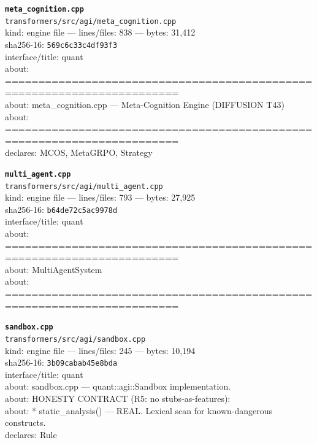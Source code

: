 \noindent\textbf{\texttt{meta\_cognition.cpp}}\\
\texttt{transformers/src/agi/meta\_cognition.cpp}\\
kind: engine file --- lines/files: 838 --- bytes: 31,412\\
sha256-16: \texttt{569c6c33c4df93f3}\\
interface/title: quant\\
about: ========================================================================\\
about: meta\_cognition.cpp — Meta-Cognition Engine (DIFFUSION T43)\\
about: ========================================================================\\
declares: MCOS, MetaGRPO, Strategy\\
\vspace*{6.0pt}
\newpage

\noindent\textbf{\texttt{multi\_agent.cpp}}\\
\texttt{transformers/src/agi/multi\_agent.cpp}\\
kind: engine file --- lines/files: 793 --- bytes: 27,925\\
sha256-16: \texttt{b64de72c5ac9978d}\\
interface/title: quant\\
about: ========================================================================\\
about: MultiAgentSystem\\
about: ========================================================================\\
\vspace*{6.0pt}

\noindent\textbf{\texttt{sandbox.cpp}}\\
\texttt{transformers/src/agi/sandbox.cpp}\\
kind: engine file --- lines/files: 245 --- bytes: 10,194\\
sha256-16: \texttt{3b09cabab45e8bda}\\
interface/title: quant\\
about: sandbox.cpp — quant::agi::Sandbox implementation.\\
about: HONESTY CONTRACT (R5: no stubs-as-features):\\
about: * static\_analysis()        — REAL. Lexical scan for known-dangerous constructs.\\
declares: Rule\\
\vspace*{6.0pt}

